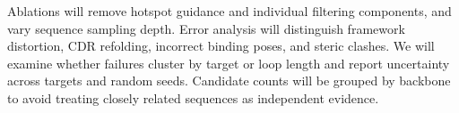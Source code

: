 Ablations will remove hotspot guidance and individual filtering components, and vary sequence sampling depth. Error analysis will distinguish framework distortion, CDR refolding, incorrect binding poses, and steric clashes. We will examine whether failures cluster by target or loop length and report uncertainty across targets and random seeds. Candidate counts will be grouped by backbone to avoid treating closely related sequences as independent evidence.
